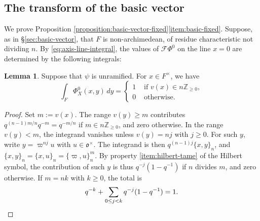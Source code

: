 \documentclass[reqno]{amsart}
\theoremstyle{plain}
\theoremstyle{definition}
\theoremstyle{itplain}
\newtheorem{lemma}[theorem]{Lemma}
\numberwithin{equation}{section}
\numberwithin{theorem}{section}
\begin{document}
\subsection{The transform of the basic vector}\label{sec:basic-vector-transform}
We prove Proposition \ref{proposition:basic-vector-fixed}\eqref{item:basic-fixed}.  Suppose, as in \S\ref{sec:basic-vector}, that $F$ is non-archimedean, of residue characteristic not dividing $n$.  By \eqref{eq:axis-line-integral}, the values of $\mathcal{F} \Phi^0$ on the line $x = 0$ are determined by the following integrals:

\begin{lemma}\label{lemma:basic-vector-marginal}
  Suppose that $\psi$ is unramified.  For $x \in F^\times$, we have
  \begin{equation*}
    \int_F \Phi^0_X(x, y) \, d y =
    \begin{cases}
      1 & \text{ if } v(x) \in n \mathbb{Z}_{\geq 0}, \\
      0 & \text{ otherwise.}
    \end{cases}
  \end{equation*}
\end{lemma}
\begin{proof}
  Set $m := v(x)$.  The range $v(y) \geq m$ contributes $q^{(n-1) m / n} q^{-m} = q^{- m / n}$ if $m \in n \mathbb{Z}_{\geq 0}$, and zero otherwise.  In the range $v(y) < m$, the integrand vanishes unless $v(y) = n j$ with $j \geq 0$.  For such $y$, write $y = \varpi^{n j} u$ with $u \in \mathfrak{o}^\times$.  The integrand is then $q^{(n-1) j} \{x, y\}_n$, and $\{x, y\}_n = \{x, u\}_n = \{\varpi, u\}_n^{m}$.  By property \eqref{item:hilbert-tame} of the Hilbert symbol, the contribution of such $y$ is thus $q^{- j} (1 - q^{-1})$ if $n$ divides $m$, and zero otherwise.  If $m = n k$ with $k \geq 0$, the total is
  \begin{equation*}
    q^{-k} + \sum_{0 \leq j < k} q^{-j} (1 - q^{-1}) = 1.
    \qedhere
  \end{equation*}
\end{proof}
\end{document}
